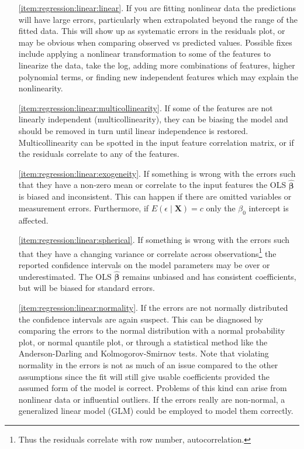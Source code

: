 \begin{itemize}[noitemsep]
\item[\ref{item:regression:linear:linear}.] If you are fitting nonlinear data the predictions will have large errors,
particularly when extrapolated beyond the range of the fitted data.
This will show up as systematic errors in the residuals plot,
or may be obvious when comparing observed vs predicted values.
Possible fixes include applying a nonlinear transformation to some of the features to linearize the data, \eg take the log,
adding more combinations of features, \eg higher polynomial terms,
or finding new independent features which may explain the nonlinearity.

\item[\ref{item:regression:linear:multicollinearity}.] If some of the features are not linearly independent (multicollinearity),
they can be biasing the model and should be removed in turn until linear independence is restored.
Multicollinearity can be spotted in the input feature correlation matrix,
or if the residuals correlate to any of the features.

\item[\ref{item:regression:linear:exogeneity}.] If something is wrong with the errors
such that they have a non-zero mean or correlate to the input features
the OLS $\hat{\bm{\beta}}$ is biased and inconsistent.
This can happen if there are omitted variables or measurement errors.
Furthermore, if $E\left(\epsilon \mid \mathbf{X}\right) = c$ only the $\beta_{0}$ intercept is affected.

\item[\ref{item:regression:linear:spherical}.] If something is wrong with the errors
such that they have a changing variance or correlate across observations\footnote{Thus the residuals correlate with row number, \ie autocorrelation.}
the reported confidence intervals on the model parameters may be over or underestimated.
The OLS $\hat{\bm{\beta}}$ remains unbiased and has consistent coefficients, but will be biased for standard errors.

\item[\ref{item:regression:linear:normality}.] If the errors are not normally distributed the confidence intervals are again suspect.
This can be diagnosed by comparing the errors to the normal distribution with a normal probability plot, or normal quantile plot,
or through a statistical method like the Anderson-Darling and Kolmogorov-Smirnov tests.
Note that violating normality in the errors is not as much of an issue compared to the other assumptions
since the fit will still give usable coefficients provided the assumed form of the model is correct.
Problems of this kind can arise from nonlinear data or influential outliers.
If the errors really are non-normal, a generalized linear model (GLM) could be employed to model them correctly.
\end{itemize}

